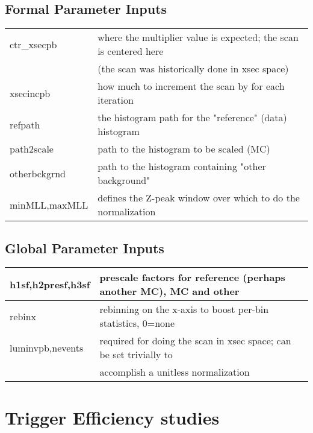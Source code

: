 \documentclass[english]{article}
\begin{document}
\subsection{Formal Parameter Inputs}
\begin{tabular}{|l|l|}
\hline
ctr\_xsecpb   & where the multiplier value is expected; the scan is centered here \\
              &  (the scan was historically done in xsec space)                   \\ \hline
xsecincpb     & how much to increment the scan by for each iteration              \\ \hline
refpath       & the histogram path for the "reference" (data) histogram           \\ \hline
path2scale    & path to the histogram to be scaled (MC)                           \\ \hline
otherbckgrnd  & path to the histogram containing "other background"               \\ \hline
minMLL,maxMLL & defines the Z-peak window over which to do the normalization      \\ \hline
\end{tabular}

\subsection{Global Parameter Inputs}
\begin{tabular}{|l|l|}
\hline
h1sf,h2presf,h3sf   & prescale factors for reference (perhaps another MC), MC and other \\ \hline
rebinx              & rebinning on the x-axis to boost per-bin statistics, 0=none       \\ \hline
luminvpb,nevents    & required for doing the scan in xsec space; can be set trivially to \\ 
                    & accomplish a unitless normalization                                \\ \hline
\end{tabular}

\section{Trigger Efficiency studies}
\end{document}
